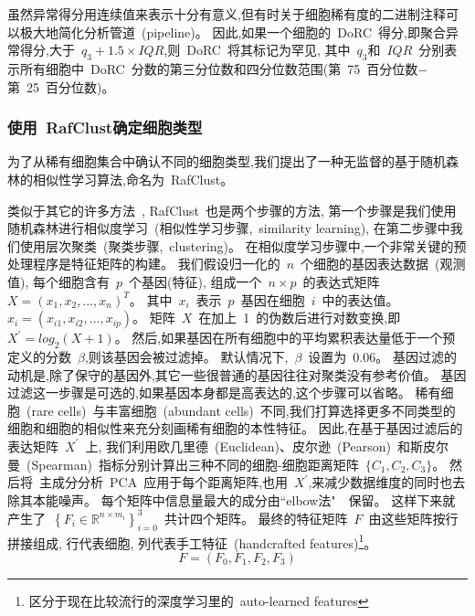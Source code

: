 虽然异常得分用连续值来表示十分有意义,但有时关于细胞稀有度的二进制注释可以极大地简化分析管道~(pipeline)。
因此,如果一个细胞的~DoRC~得分,即聚合异常得分,大于~$q_3 + 1.5 \times IQR$,则~DoRC~将其标记为罕见,
其中~$q_3$和~$IQR$~分别表示所有细胞中~DoRC~分数的第三分位数和四分位数范围(第~75~百分位数$-$第~25~百分位数)。

\subsubsection{使用~RafClust确定细胞类型}
\label{subsec:rafclust} 
为了从稀有细胞集合中确认不同的细胞类型,我们提出了一种无监督的基于随机森林的相似性学习算法,命名为~RafClust。

类似于其它的许多方法~\cite{kiselev2017sc3,pouyan2018random,mohammadi2018geometric,sinha2018dropclust,Srinivasan511626,Li530378,zheng2019sinnlrr},
RafClust~也是两个步骤的方法,
第一个步骤是我们使用随机森林进行相似度学习~(相似性学习步骤,~similarity learning),
在第二步骤中我们使用层次聚类~(聚类步骤,~clustering)。
在相似度学习步骤中,一个非常关键的预处理程序是特征矩阵的构建。
我们假设归一化的~$n$~个细胞的基因表达数据~(观测值), 每个细胞含有~$p$~个基因(特征),
组成一个~$n \times p$~的表达式矩阵~$X=\left(x_{1}, x_{2}, \ldots, x_{n} \right)^ T$。
其中~$x_{i}$~表示~$p$~基因在细胞~$i$~中的表达值。
$x_{i}=\left(x_{i1}, x_{i2},\ldots, x_{ip} \right)$。
矩阵~$X$~在加上~1~的伪数后进行对数变换,即~$X^{\prime} = log_2 (X + 1)$。
然后,如果基因在所有细胞中的平均累积表达量低于一个预定义的分数~$\beta$,则该基因会被过滤掉。
默认情况下,~$\beta$~设置为~0.06。 
基因过滤的动机是,除了保守的基因外,其它一些很普通的基因往往对聚类没有参考价值。
基因过滤这一步骤是可选的,如果基因本身都是高表达的,这个步骤可以省略。
稀有细胞~(rare cells)~与丰富细胞~(abundant cells)~不同,我们打算选择更多不同类型的细胞和细胞的相似性来充分刻画稀有细胞的本性特征。
因此,在基于基因过滤后的表达矩阵~$X^{\prime}$~上,
我们利用欧几里德~(Euclidean)、皮尔逊~(Pearson)~和斯皮尔曼~(Spearman)~指标分别计算出三种不同的细胞-细胞距离矩阵~$\{C_1, C_2, C_3\}$。
然后将~主成分分析~PCA~应用于每个距离矩阵,也用~$X^{\prime}$,来减少数据维度的同时也去除其本能噪声。
每个矩阵中信息量最大的成分由``elbow法"~\cite{thorndike1953belongs}~保留。
这样下来就产生了~$\left\{ {F}_{i} \in \mathbb {R} ^ {n \times m_{i}} \right\}_{i = 0}^{3}$~共计四个矩阵。
最终的特征矩阵~$F$~由这些矩阵按行拼接组成, 行代表细胞, 列代表手工特征~(handcrafted features)\footnote{区分于现在比较流行的深度学习里的~auto-learned features}。
\begin{equation}
\label{lab:f}
{F} = ({F}_{0}, {F}_{1}, {F}_{2}, {F}_{3})
\end{equation}

